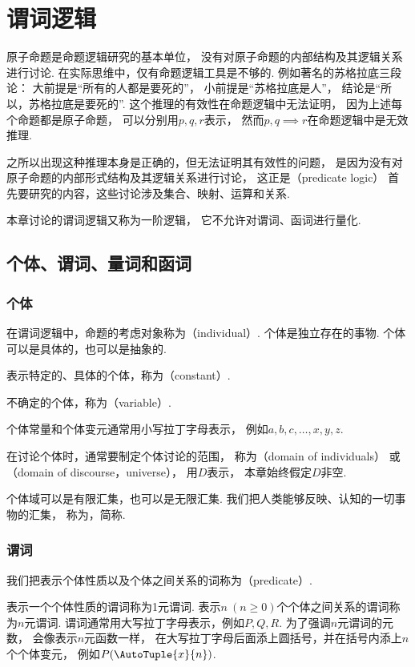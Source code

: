 \chapter{谓词逻辑}
原子命题是命题逻辑研究的基本单位，
没有对原子命题的内部结构及其逻辑关系进行讨论.
在实际思维中，仅有命题逻辑工具是不够的.
例如著名的苏格拉底三段论：
大前提是“所有的人都是要死的”，
小前提是“苏格拉底是人”，
结论是“所以，苏格拉底是要死的”.
这个推理的有效性在命题逻辑中无法证明，
因为上述每个命题都是原子命题，
可以分别用\(p,q,r\)表示，
然而\(p,q \implies r\)在命题逻辑中是无效推理.

之所以出现这种推理本身是正确的，但无法证明其有效性的问题，
是因为没有对原子命题的内部形式结构及其逻辑关系进行讨论，
这正是（predicate logic）
首先要研究的内容，这些讨论涉及集合、映射、运算和关系.

本章讨论的谓词逻辑又称为一阶逻辑，
它不允许对谓词、函词进行量化.

\section{个体、谓词、量词和函词}
\subsection{个体}
在谓词逻辑中，命题的考虑对象称为（individual）.
个体是独立存在的事物.
个体可以是具体的，也可以是抽象的.

表示特定的、具体的个体，称为（constant）.

不确定的个体，称为（variable）.

个体常量和个体变元通常用小写拉丁字母表示，
例如\(a,b,c,\dotsc,x,y,z\).

在讨论个体时，通常要制定个体讨论的范围，
称为（domain of individuals）
或（domain of discourse，universe），
用\(D\)表示，
本章始终假定\(D\)非空.

个体域可以是有限汇集，也可以是无限汇集.
我们把人类能够反映、认知的一切事物的汇集，
称为，简称.

\subsection{谓词}
我们把表示个体性质以及个体之间关系的词称为（predicate）.

表示一个个体性质的谓词称为1元谓词.
表示\(n\ (n\geq0)\)个个体之间关系的谓词称为\(n\)元谓词.
谓词通常用大写拉丁字母表示，例如\(P,Q,R\).
为了强调\(n\)元谓词的元数，
会像表示\(n\)元函数一样，
在大写拉丁字母后面添上圆括号，并在括号内添上\(n\)个个体变元，
例如\(P(\AutoTuple{x}{n})\).

